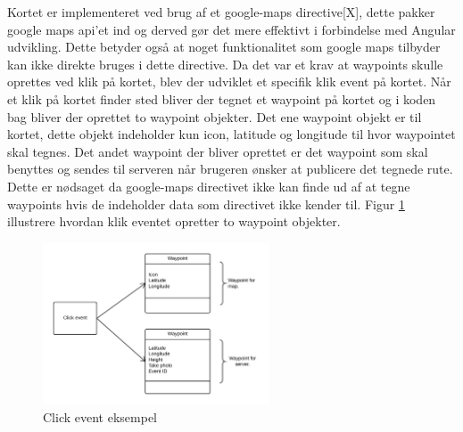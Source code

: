 Kortet er implementeret ved brug af et google-maps directive[X], dette pakker google maps api'et ind og derved gør det mere effektivt i forbindelse med Angular udvikling. Dette betyder også at noget funktionalitet som google maps tilbyder kan ikke direkte bruges i dette directive. Da det var et krav at waypoints skulle oprettes ved klik på kortet, blev der udviklet et specifik klik event på kortet. Når et klik på kortet finder sted bliver der tegnet et waypoint på kortet og i koden bag bliver der oprettet to waypoint objekter. Det ene waypoint objekt er til kortet, dette objekt indeholder kun icon, latitude og longitude til hvor waypointet skal tegnes. Det andet waypoint der bliver oprettet er det waypoint som skal benyttes og sendes til serveren når brugeren ønsker at publicere det tegnede rute. Dette er nødsaget da google-maps directivet ikke kan finde ud af at tegne waypoints hvis de indeholder data som directivet ikke kender til. Figur \ref{fig:click_event} illustrere hvordan klik eventet opretter to waypoint objekter.

\vspace{-5pt}
\begin{figure}[H]
	\centering
	\includegraphics[width=0.6\textwidth]{Billeder/click_event.png}
	\vspace{-5pt}
	\caption{Click event eksempel}
	\label{fig:click_event}
\end{figure}